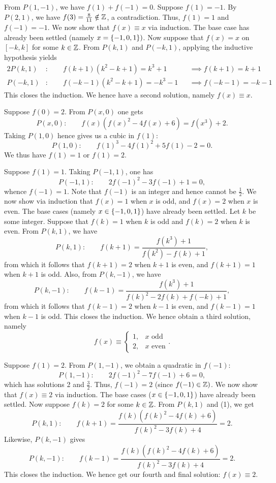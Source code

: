 From $P(1, -1)$, we have $f(1) + f(-1) = 0$. Suppose $f(1) = -1$. By $P(2, 1)$, we have $f(3) = \frac8{11} \notin \mathbb{Z}$, a contradiction. Thus, $f(1) = 1$ and $f(-1) = -1$. We now show that $f(x) \equiv x$ via induction. The base case has already been settled (namely $x = \left\lbrace -1, 0, 1 \right\rbrace)$. Now suppose that $f(x) = x$ on $[-k, k]$ for some $k \in \mathbb{Z}$. From $P(k, 1)$ and $P(-k, 1)$, applying the inductive hypothesis yields
\begin{alignat*}{2}
    P(k, 1) &: \qquad f(k+1)(k^2 - k + 1) = k^3 + 1 &&\implies f(k+1) = k+1\\
    P(-k, 1) &: \qquad f(-k-1)(k^2 - k + 1) = -k^3 -1 &&\implies f(-k-1) = -k-1
\end{alignat*}
This closes the induction. We hence have a second solution, namely $f(x) \equiv x$.

 Suppose $f(0) = 2$. From $P(x, 0)$ one gets \[P(x, 0) : \qquad f(x)(f(x)^2 - 4f(x) + 6) = f(x^3) + 2. \tag{1}\] Taking $P(1, 0)$ hence gives us a cubic in $f(1)$: \[P(1, 0) : \qquad f(1)^3 - 4f(1)^2 + 5f(1) - 2 = 0.\] We thus have $f(1) = 1$ or $f(1) = 2$.

 Suppose $f(1) = 1$. Taking $P(-1, 1)$, one has \[P(-1, 1): \qquad 2f(-1)^2 - 3f(-1) + 1 = 0,\] whence $f(-1) = 1$. Note that $f(-1)$ is an integer and hence cannot be $\frac12$. We now show via induction that $f(x) = 1$ when $x$ is odd, and $f(x) = 2$ when $x$ is even. The base cases (namely $x \in \left\lbrace -1, 0, 1 \right\rbrace$) have already been settled. Let $k$ be some integer. Suppose that $f(k) = 1$ when $k$ is odd and $f(k) = 2$ when $k$ is even. From $P(k, 1)$, we have
\[P(k, 1) : \qquad f(k + 1) = \frac{f(k^3) + 1}{f(k^2) - f(k) + 1},\] from which it follows that $f(k + 1) = 2$ when $k + 1$ is even, and $f(k + 1) = 1$ when $k + 1$ is odd. Also, from $P(k, -1)$, we have \[P(k, -1) : \qquad f(k-1) = \frac{f(k^3) + 1}{f(k)^2 - 2f(k) + f(-k) + 1},\] from which it follows that $f(k - 1) = 2$ when $k - 1$ is even, and $f(k - 1) = 1$ when $k - 1$ is odd. This closes the induction. We hence obtain a third solution, namely \[f(x) \equiv \begin{cases}
    1, &\text{$x$ odd}\\
    2, &\text{$x$ even}
\end{cases}.\]

 Suppose $f(1) = 2$. From $P(1, -1)$, we obtain a quadratic in $f(-1)$: \[P(1, -1) : \qquad 2f(-1)^2 - 7f(-1) + 6 = 0,\] which has solutions 2 and $\frac32$. Thus, $f(-1) = 2$ (since $f(-1) \in \mathbb{Z})$. We now show that $f(x) \equiv 2$ via induction. The base cases ($x \in \left\lbrace -1, 0, 1 \right\rbrace$) have already been settled. Now suppose $f(k) = 2$ for some $k \in \mathbb{Z}$. From $P(k, 1)$ and (1), we get \[P(k, 1) : \qquad f(k+1) = \frac{f(k)(f(k)^2 - 4f(k) + 6)}{f(k)^2 - 3f(k) + 4} = 2.\] Likewise, $P(k, -1)$ gives \[P(k, -1) : \qquad f(k-1) = \frac{f(k)(f(k)^2 - 4f(k) + 6)}{f(k)^2 - 3f(k) + 4} = 2.\] This closes the induction. We hence get our fourth and final solution: $f(x) \equiv 2$.

